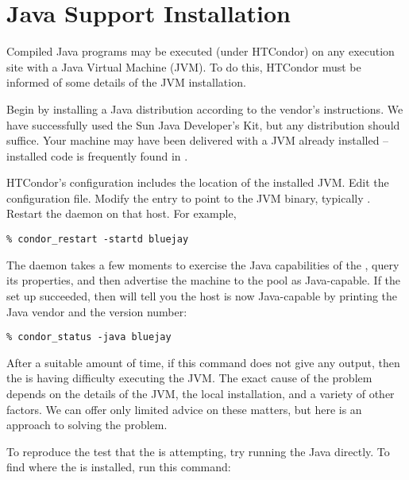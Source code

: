 \section{\label{sec:java-install}Java Support Installation}


Compiled Java programs may be executed (under HTCondor) on
any
execution site with a
Java Virtual Machine (JVM).
To do this,
HTCondor must be informed of some details of the
JVM installation.

Begin by installing a Java distribution according to the vendor's
instructions.
We have successfully used the Sun Java Developer's Kit,
but any distribution should suffice.
Your machine may have
been delivered with a JVM already installed -- installed code
is frequently found in .

HTCondor's configuration includes the location of the installed
JVM.
Edit the configuration file.
Modify the  entry to point to the JVM binary,
typically .
Restart the  daemon on that host.  For example,

\begin{verbatim}
% condor_restart -startd bluejay
\end{verbatim}

The  daemon takes a few moments to exercise the Java
capabilities of the , query its properties,
and then advertise the machine
to the pool as Java-capable.
If the set up succeeded, then  will
tell you the host is now Java-capable by printing the Java
vendor and the version number:

\begin{verbatim}
% condor_status -java bluejay
\end{verbatim}

After a suitable amount of time, if this command does not give any output,
then the   is having difficulty executing the JVM.
The exact cause of the problem depends on the details of the
JVM, the local installation, and a variety of other factors.
We can offer only limited advice on these matters,
but here is an approach to solving the problem.

To reproduce the test that the  is attempting,
try running the Java  directly.  To find
where the  is installed, run this command:

